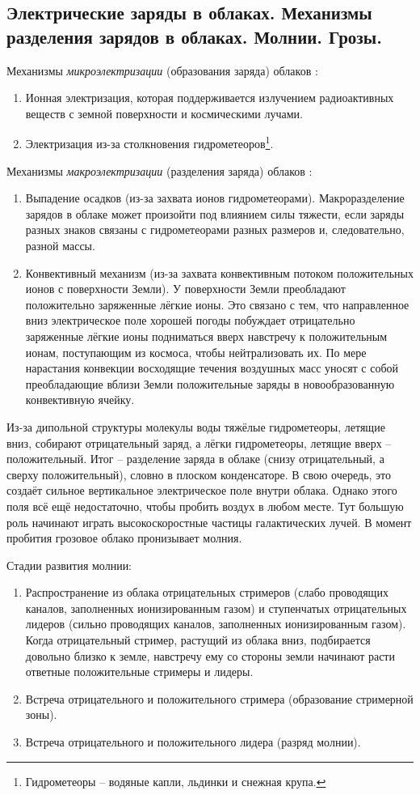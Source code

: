\subsection{Электрические заряды в облаках. Механизмы разделения зарядов в облаках. Молнии. Грозы.}
Механизмы \textit{микроэлектризации} (образования заряда) облаков \cite{Кашлева-2008}:
\begin{enumerate}
\item Ионная электризация, которая поддерживается излучением радиоактивных веществ с земной поверхности и космическими лучами.
\item Электризация из-за столкновения гидрометеоров\footnote{Гидрометеоры -- водяные капли, льдинки и снежная крупа.}.
\end{enumerate}
Механизмы \textit{макроэлектризации} (разделения заряда) облаков \cite{Кашлева-2008}:
\begin{enumerate}
\item Выпадение осадков (из-за захвата ионов гидрометеорами). Макроразделение зарядов в облаке может произойти под влиянием силы тяжести, если заряды разных знаков связаны с гидрометеорами разных размеров и, следовательно, разной массы.
\item Конвективный механизм (из-за захвата конвективным потоком положительных ионов с поверхности Земли). У поверхности Земли преобладают положительно заряженные лёгкие ионы. Это связано с тем, что направленное вниз электрическое поле хорошей погоды побуждает отрицательно заряженные лёгкие ионы подниматься вверх навстречу к положительным ионам, поступающим из космоса, чтобы нейтрализовать их. По мере нарастания конвекции восходящие течения воздушных масс уносят с собой преобладающие вблизи Земли положительные заряды в новообразованную конвективную ячейку.
\end{enumerate}

Из-за дипольной структуры молекулы воды тяжёлые гидрометеоры, летящие вниз, собирают отрицательный заряд, а лёгки гидрометеоры, летящие вверх -- положительный. Итог -- разделение заряда в облаке (снизу отрицательный, а сверху положительный), словно в плоском конденсаторе.
В свою очередь, это создаёт сильное вертикальное электрическое поле внутри облака.
Однако этого поля всё ещё недостаточно, чтобы пробить воздух в любом месте.
Тут большую роль начинают играть высокоскоростные частицы галактических лучей.
В момент пробития грозовое облако пронизывает молния.

Стадии развития молнии:
\begin{enumerate}
\item Распространение из облака отрицательных стримеров (слабо проводящих каналов, заполненных ионизированным газом) и ступенчатых отрицательных лидеров (сильно проводящих каналов, заполненных ионизированным газом). Когда отрицательный стример, растущий из облака вниз, подбирается довольно близко к земле, навстречу ему со стороны земли начинают расти ответные положительные стримеры и лидеры.
\item Встреча отрицательного и положительного стримера (образование стримерной зоны).
\item Встреча отрицательного и положительного лидера (разряд молнии).
\end{enumerate}
